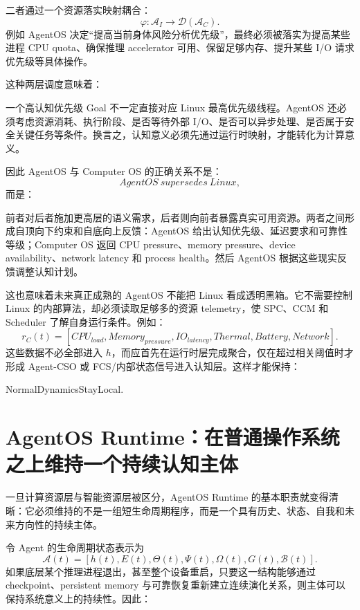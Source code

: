 二者通过一个资源落实映射耦合：
\[
\varphi:
\mathcal A_I
\rightarrow
\mathcal D(\mathcal A_C).
\]
例如 AgentOS 决定“提高当前身体风险分析优先级”，最终必须被落实为提高某些进程 CPU quota、确保推理 accelerator 可用、保留足够内存、提升某些 I/O 请求优先级等具体操作。

这种两层调度意味着：
\begin{statementbox}
\centering
{}
\end{statementbox}
一个高认知优先级 Goal 不一定直接对应 Linux 最高优先级线程。AgentOS 还必须考虑资源消耗、执行阶段、是否等待外部 I/O、是否可以异步处理、是否属于安全关键任务等条件。换言之，认知意义必须先通过运行时映射，才能转化为计算意义。

因此 AgentOS 与 Computer OS 的正确关系不是：
\[
AgentOS\ supersedes\ Linux,
\]
而是：
\begin{statementbox}
\centering
{}
\end{statementbox}
前者对后者施加更高层的语义需求，后者则向前者暴露真实可用资源。两者之间形成自顶向下约束和自底向上反馈：AgentOS 给出认知优先级、延迟要求和可靠性等级；Computer OS 返回 CPU pressure、memory pressure、device availability、network latency 和 process health。然后 AgentOS 根据这些现实反馈调整认知计划。

这也意味着未来真正成熟的 AgentOS 不能把 Linux 看成透明黑箱。它不需要控制 Linux 的内部算法，却必须读取足够多的资源 telemetry，使 SPC、CCM 和 Scheduler 了解自身运行条件。例如：
\[
r_C(t)
=
[
CPU_{load},
Memory_{pressure},
IO_{latency},
Thermal,
Battery,
Network
].
\]
这些数据不必全部进入 $h$，而应首先在运行时层完成聚合，仅在超过相关阈值时才形成 Agent-CSO 或 FCS/内部状态信号进入认知层。这样才能保持：
\begin{statementbox}
NormalDynamicsStayLocal.
\end{statementbox}

\section{AgentOS Runtime：在普通操作系统之上维持一个持续认知主体}

一旦计算资源层与智能资源层被区分，AgentOS Runtime 的基本职责就变得清晰：它必须维持的不是一组短生命周期程序，而是一个具有历史、状态、自我和未来方向性的持续主体。

令 Agent 的生命周期状态表示为
\[
\mathcal A(t)
=
[
h(t),
E(t),
\Theta(t),
\Psi(t),
\Omega(t),
G(t),
\mathcal B(t)
].
\]
如果底层某个推理进程退出，甚至整个设备重启，只要这一结构能够通过 checkpoint、persistent memory 与可靠恢复重新建立连续演化关系，则主体可以保持系统意义上的持续性。因此：
\begin{statementbox}
\centering
{}
\end{statementbox}

